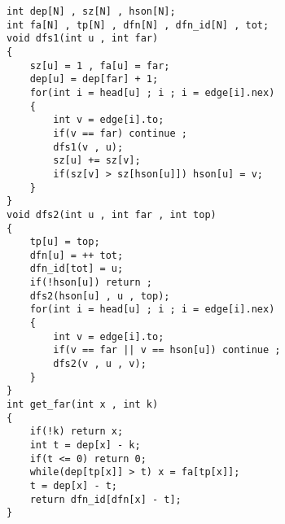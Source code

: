 \documentclass[E:/GsjzTle/main/main.tex]{subfiles}
\begin{document}
\begin{lstlisting}
int dep[N] , sz[N] , hson[N];
int fa[N] , tp[N] , dfn[N] , dfn_id[N] , tot;
void dfs1(int u , int far)
{
	sz[u] = 1 , fa[u] = far;
	dep[u] = dep[far] + 1; 
	for(int i = head[u] ; i ; i = edge[i].nex)
	{
		int v = edge[i].to;
		if(v == far) continue ;		
		dfs1(v , u);
		sz[u] += sz[v];
		if(sz[v] > sz[hson[u]]) hson[u] = v;
	}
} 
void dfs2(int u , int far , int top)
{
	tp[u] = top;
	dfn[u] = ++ tot;
	dfn_id[tot] = u; 
	if(!hson[u]) return ;
	dfs2(hson[u] , u , top);
	for(int i = head[u] ; i ; i = edge[i].nex)
	{
		int v = edge[i].to;
		if(v == far || v == hson[u]) continue ;
		dfs2(v , u , v);
	}
}
int get_far(int x , int k)
{
	if(!k) return x;
	int t = dep[x] - k;
	if(t <= 0) return 0;
	while(dep[tp[x]] > t) x = fa[tp[x]];
	t = dep[x] - t;
	return dfn_id[dfn[x] - t];
}
\end{lstlisting}
\end{document}
